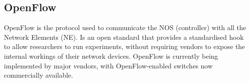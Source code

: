 \subsection{OpenFlow}
\label{sec:openflow}

OpenFlow is the protocol used to communicate the NOS (controller) with all the Network Elements (NE). Is an open standard that provides a standardised hook to allow researchers to run experiments, without requiring vendors to expose the internal workings of their network devices. OpenFlow is currently being implemented by major vendors, with OpenFlow-enabled switches now commercially available.







